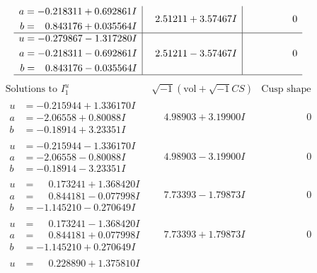 \documentclass[1p]{elsarticle_modified}
\theoremstyle{definition}
\newcommand{\I}{\sqrt{-1}}
\begin{document}
$$\begin{array}{c|c|c}
\begin{aligned}
a &= -0.218311 + 0.692861 I \\
b &= \phantom{-}0.843176 + 0.035564 I\end{aligned}
 & \phantom{-}2.51211 + 3.57467 I & \phantom{-0.000000 } 0 \\ \hline\begin{aligned}
u &= -0.279867 - 1.317280 I \\
a &= -0.218311 - 0.692861 I \\
b &= \phantom{-}0.843176 - 0.035564 I\end{aligned}
 & \phantom{-}2.51211 - 3.57467 I & \phantom{-0.000000 } 0\\
 \hline 
 \end{array}$$\newpage$$\begin{array}{c|c|c}  
\text{Solutions to }I^u_{1}& \I (\text{vol} + \sqrt{-1}CS) & \text{Cusp shape}\\
 \hline 
\begin{aligned}
u &= -0.215944 + 1.336170 I \\
a &= -2.06558 + 0.80088 I \\
b &= -0.18914 + 3.23351 I\end{aligned}
 & \phantom{-}4.98903 + 3.19900 I & \phantom{-0.000000 } 0 \\ \hline\begin{aligned}
u &= -0.215944 - 1.336170 I \\
a &= -2.06558 - 0.80088 I \\
b &= -0.18914 - 3.23351 I\end{aligned}
 & \phantom{-}4.98903 - 3.19900 I & \phantom{-0.000000 } 0 \\ \hline\begin{aligned}
u &= \phantom{-}0.173241 + 1.368420 I \\
a &= \phantom{-}0.844181 - 0.077998 I \\
b &= -1.145210 - 0.270649 I\end{aligned}
 & \phantom{-}7.73393 - 1.79873 I & \phantom{-0.000000 } 0 \\ \hline\begin{aligned}
u &= \phantom{-}0.173241 - 1.368420 I \\
a &= \phantom{-}0.844181 + 0.077998 I \\
b &= -1.145210 + 0.270649 I\end{aligned}
 & \phantom{-}7.73393 + 1.79873 I & \phantom{-0.000000 } 0 \\ \hline\begin{aligned}
u &= \phantom{-}0.228890 + 1.375810 I \\

\end{aligned}
\end{array}$$
\end{document}
